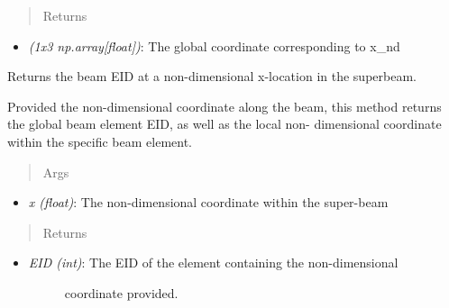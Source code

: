 \documentclass[letterpaper,10pt,english]{sphinxmanual}
\begin{document}
\begin{fulllineitems}
\begin{fulllineitems}
\begin{itemize}
\begin{description}
\end{description}

\end{itemize}
\begin{quote}\begin{description}
\item[{Returns}] \leavevmode
\end{description}\end{quote}
\begin{itemize}
\item {} 
\emph{(1x3 np.array{[}float{]})}: The global coordinate corresponding to x\_nd

\end{itemize}

\end{fulllineitems}


\begin{fulllineitems}
\label{structures:AeroComBAT.Structures.SuperBeam.getEIDatx}
Returns the beam EID at a non-dimensional x-location in the superbeam.

Provided the non-dimensional coordinate along the beam, this method
returns the global beam element EID, as well as the local non-
dimensional coordinate within the specific beam element.
\begin{quote}\begin{description}
\item[{Args}] \leavevmode
\end{description}\end{quote}
\begin{itemize}
\item {} 
\emph{x (float)}: The non-dimensional coordinate within the super-beam

\end{itemize}
\begin{quote}\begin{description}
\item[{Returns}] \leavevmode
\end{description}\end{quote}
\begin{itemize}
\item {} \begin{description}
\item[{\emph{EID (int)}: The EID of the element containing the non-dimensional}] \leavevmode
coordinate provided.


\end{description}
\end{itemize}
\end{fulllineitems}
\end{fulllineitems}
\end{document}
